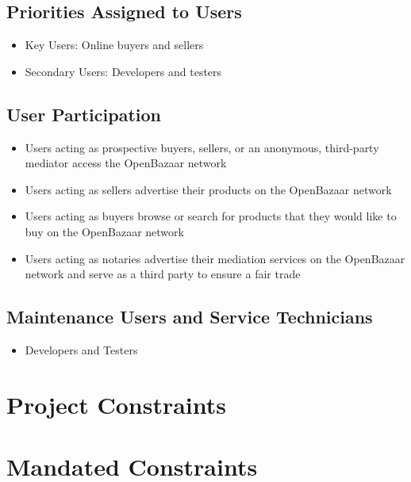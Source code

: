 \documentclass{article}
\begin{document}
\subsection{Priorities Assigned to Users}
\begin{itemize}
\item
Key Users: Online buyers and sellers

\item
Secondary Users: Developers and testers
\end{itemize}

\subsection{User Participation}
\begin{itemize}
\item 
Users acting as prospective buyers, sellers, or an anonymous, third-party mediator access the OpenBazaar network		

\item
Users acting as sellers advertise their products on the OpenBazaar network

\item
Users acting as buyers browse or search for products that they would like to buy on the OpenBazaar network

\item
Users acting as notaries advertise their mediation services on the OpenBazaar network and serve as a third party to ensure a fair trade
\end{itemize}

\subsection{Maintenance Users and Service Technicians}
\begin{itemize}
\item
Developers and Testers
\end{itemize}

\section*{Project Constraints}

\section{Mandated Constraints}
\end{document}
